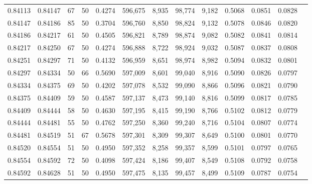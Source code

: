 \begin{tabular}{rrrrrrrrrrrrr}
0.84113 & 0.84147 &    67 &  50 &                                     0.4274 & 596,675 &   8,935 &  98,774 &   9,182 & 0.5068 & 0.0851 & 0.0828 \\
0.84147 & 0.84186 &    85 &  50 &                                     0.3704 & 596,760 &   8,850 &  98,824 &   9,132 & 0.5078 & 0.0846 & 0.0820 \\
0.84186 & 0.84217 &    61 &  50 &                                     0.4505 & 596,821 &   8,789 &  98,874 &   9,082 & 0.5082 & 0.0841 & 0.0814 \\
0.84217 & 0.84250 &    67 &  50 &                                     0.4274 & 596,888 &   8,722 &  98,924 &   9,032 & 0.5087 & 0.0837 & 0.0808 \\
0.84251 & 0.84297 &    71 &  50 &                                     0.4132 & 596,959 &   8,651 &  98,974 &   8,982 & 0.5094 & 0.0832 & 0.0801 \\
0.84297 & 0.84334 &    50 &  66 &                                     0.5690 & 597,009 &   8,601 &  99,040 &   8,916 & 0.5090 & 0.0826 & 0.0797 \\
0.84334 & 0.84375 &    69 &  50 &                                     0.4202 & 597,078 &   8,532 &  99,090 &   8,866 & 0.5096 & 0.0821 & 0.0790 \\
0.84375 & 0.84409 &    59 &  50 &                                     0.4587 & 597,137 &   8,473 &  99,140 &   8,816 & 0.5099 & 0.0817 & 0.0785 \\
0.84409 & 0.84444 &    58 &  50 &                                     0.4630 & 597,195 &   8,415 &  99,190 &   8,766 & 0.5102 & 0.0812 & 0.0779 \\
0.84444 & 0.84481 &    55 &  50 &                                     0.4762 & 597,250 &   8,360 &  99,240 &   8,716 & 0.5104 & 0.0807 & 0.0774 \\
0.84481 & 0.84519 &    51 &  67 &                                     0.5678 & 597,301 &   8,309 &  99,307 &   8,649 & 0.5100 & 0.0801 & 0.0770 \\
0.84520 & 0.84554 &    51 &  50 &                                     0.4950 & 597,352 &   8,258 &  99,357 &   8,599 & 0.5101 & 0.0797 & 0.0765 \\
0.84554 & 0.84592 &    72 &  50 &                                     0.4098 & 597,424 &   8,186 &  99,407 &   8,549 & 0.5108 & 0.0792 & 0.0758 \\
0.84592 & 0.84628 &    51 &  50 &                                     0.4950 & 597,475 &   8,135 &  99,457 &   8,499 & 0.5109 & 0.0787 & 0.0754 \\

\end{tabular}
